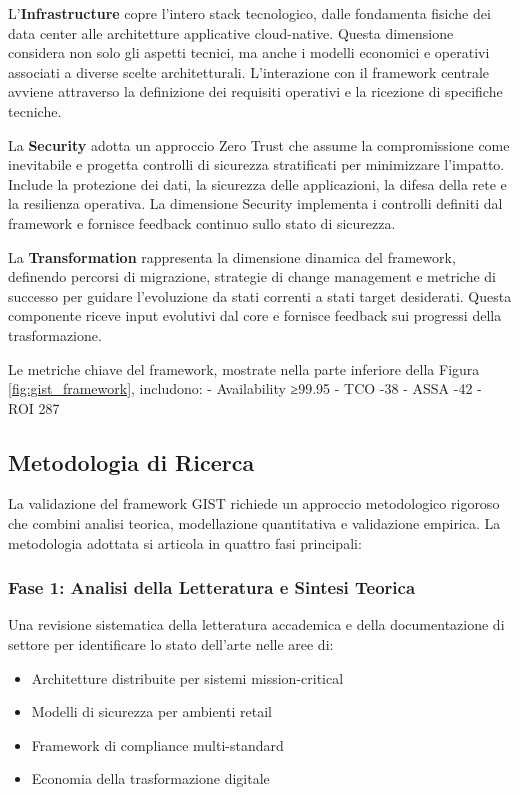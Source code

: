 L'\textbf{Infrastructure} copre l'intero stack tecnologico, dalle fondamenta fisiche dei data center alle architetture applicative cloud-native. Questa dimensione considera non solo gli aspetti tecnici, ma anche i modelli economici e operativi associati a diverse scelte architetturali. L'interazione con il framework centrale avviene attraverso la definizione dei requisiti operativi e la ricezione di specifiche tecniche.

La \textbf{Security} adotta un approccio Zero Trust che assume la compromissione come inevitabile e progetta controlli di sicurezza stratificati per minimizzare l'impatto. Include la protezione dei dati, la sicurezza delle applicazioni, la difesa della rete e la resilienza operativa. La dimensione Security implementa i controlli definiti dal framework e fornisce feedback continuo sullo stato di sicurezza.

La \textbf{Transformation} rappresenta la dimensione dinamica del framework, definendo percorsi di migrazione, strategie di change management e metriche di successo per guidare l'evoluzione da stati correnti a stati target desiderati. Questa componente riceve input evolutivi dal core e fornisce feedback sui progressi della trasformazione.

Le metriche chiave del framework, mostrate nella parte inferiore della Figura \ref{fig:gist_framework}, includono:
- Availability ≥99.95%
- TCO -38%
- ASSA -42%
- ROI 287%

\subsection{Metodologia di Ricerca}

La validazione del framework GIST richiede un approccio metodologico rigoroso che combini analisi teorica, modellazione quantitativa e validazione empirica. La metodologia adottata si articola in quattro fasi principali:

\subsubsection{Fase 1: Analisi della Letteratura e Sintesi Teorica}

Una revisione sistematica della letteratura accademica e della documentazione di settore per identificare lo stato dell'arte nelle aree di:
\begin{itemize}
\item Architetture distribuite per sistemi mission-critical
\item Modelli di sicurezza per ambienti retail
\item Framework di compliance multi-standard
\item Economia della trasformazione digitale
\end{itemize}

